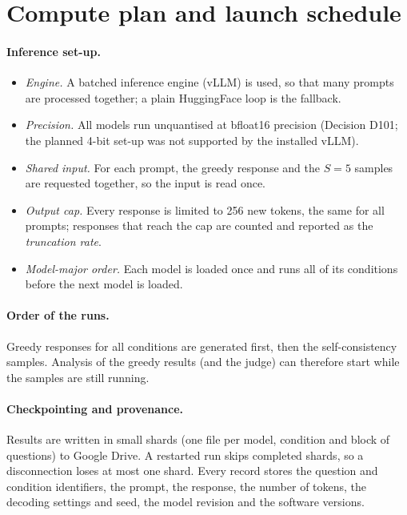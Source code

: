 \documentclass[11pt,a4paper]{report}
\begin{document}
\section{Compute plan and launch schedule}\label{sec:computeplan}

\paragraph{Inference set-up.}
\begin{itemize}[nosep]
  \item \emph{Engine.} A batched inference engine (vLLM) is used, so that
        many prompts are processed together; a plain HuggingFace loop is
        the fallback.
  \item \emph{Precision.} All models run unquantised at bfloat16 precision (Decision D101; the planned 4-bit set-up was not supported by the installed vLLM).
  \item \emph{Shared input.} For each prompt, the greedy response and the
        $S = 5$ samples are requested together, so the input is read once.
  \item \emph{Output cap.} Every response is limited to 256 new tokens, the
        same for all prompts; responses that reach the cap are counted and
        reported as the \emph{truncation rate}.
  \item \emph{Model-major order.} Each model is loaded once and runs all of
        its conditions before the next model is loaded.
\end{itemize}

\paragraph{Order of the runs.}
Greedy responses for all conditions are generated first, then the
self-consistency samples. Analysis of the greedy results (and the judge)
can therefore start while the samples are still running.

\paragraph{Checkpointing and provenance.}
Results are written in small shards (one file per model, condition and
block of questions) to Google Drive. A restarted run skips completed
shards, so a disconnection loses at most one shard. Every record stores the
question and condition identifiers, the prompt, the response, the number of
tokens, the decoding settings and seed, the model revision and the software
versions.
\end{document}
